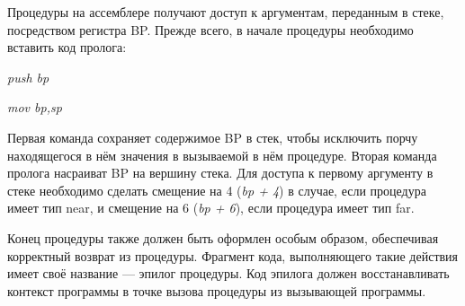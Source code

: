 Процедуры на ассемблере получают доступ к аргументам, переданным в стеке,
посредством регистра BP. Прежде всего, в начале процедуры необходимо вставить
код пролога:

\textit{push bp}

\textit{mov bp,sp}

Первая команда сохраняет содержимое BP в стек, чтобы исключить порчу находящегося
в нём значения в вызываемой в нём процедуре. Вторая команда пролога насраиват BP
на вершину стека. Для доступа к первому аргументу в стеке необходимо
сделать смещение на 4 (\textit{bp + 4}) в случае, если процедура имеет тип near,
и смещение на 6 (\textit{bp + 6}), если процедура имеет тип far.

Конец процедуры также должен быть оформлен особым образом, обеспечивая корректный
возврат из процедуры. Фрагмент кода, выполняющего такие действия имеет своё
название --- эпилог процедуры. Код эпилога должен восстанавливать контекст программы
в точке вызова процедуры из вызывающей программы.

\pagebreak
